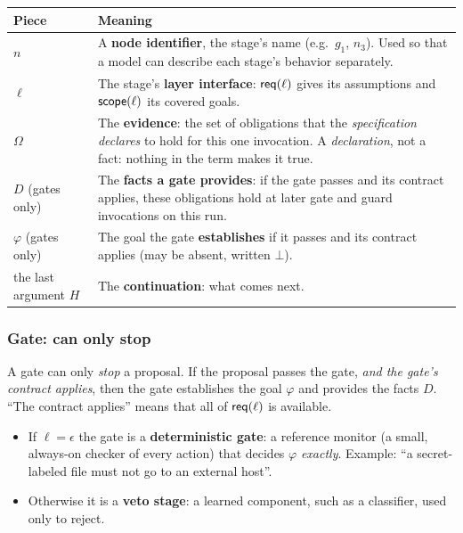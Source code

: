 \begin{center}
\renewcommand{\arraystretch}{1.3}
\begin{tabularx}{\textwidth}{@{}p{4.8cm}X@{}}
\toprule
\textbf{Piece} & \textbf{Meaning}\\
\midrule
$n$ & A \textbf{node identifier}, the stage's name (e.g.\ $g_1$, $n_3$). Used so that a model can describe each stage's behavior separately.\\
$\ell$ & The stage's \textbf{layer interface}: $\mathsf{req}(\ell)$ gives its assumptions and $\mathsf{scope}(\ell)$ its covered goals.\\
$\Omega$ & The \textbf{evidence}: the set of obligations that the \emph{specification declares} to hold for this one invocation. A \emph{declaration}, not a fact: nothing in the term makes it true.\\
$D$ (gates only) & The \textbf{facts a gate provides}: if the gate passes and its contract applies, these obligations hold at later gate and guard invocations on this run.\\
$\varphi$ (gates only) & The goal the gate \textbf{establishes} if it passes and its contract applies (may be absent, written $\bot$).\\
the last argument $H$ & The \textbf{continuation}: what comes next.\\
\bottomrule
\end{tabularx}
\end{center}

\subsubsection{Gate: can only stop}

A gate can only \emph{stop} a proposal. If the proposal passes the gate, \emph{and the gate's contract applies}, then the gate establishes the goal $\varphi$ and provides the facts $D$. ``The contract applies'' means that all of $\mathsf{req}(\ell)$ is available.

\begin{itemize}
\item If $\ell=\epsilon$ the gate is a \textbf{deterministic gate}: a reference monitor (a small, always-on checker of every action) that decides $\varphi$ \emph{exactly}. Example: ``a secret-labeled file must not go to an external host''.
\item Otherwise it is a \textbf{veto stage}: a learned component, such as a classifier, used only to reject.
\end{itemize}

